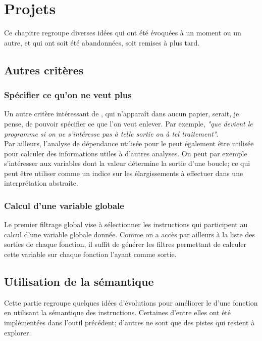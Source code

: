 \chapter{Projets}\label{sec-projets}

Ce chapitre regroupe diverses idées qui ont été évoquées à un moment ou un
autre, et qui ont soit été abandonnées, soit remises à plus tard.

\section{Autres critères}

\subsection{Spécifier ce qu'on ne veut plus}

Un autre critère intéressant de \slicing, qui n'apparaît dans aucun papier,
serait, je pense, de pouvoir spécifier ce que l'on veut enlever.
Par exemple, {\it "que devient le programme si on ne s'intéresse pas
à telle sortie ou à tel traitement"}.\\

Par ailleurs, l'analyse de dépendance utilisée pour le \slicing
peut également être utilisée pour calculer des informations utiles à d'autres
analyses. On peut par exemple s'intéresser aux variables dont la valeur
détermine la sortie d'une boucle; ce qui peut être utiliser comme un indice
sur les élargissements à effectuer dans une interprétation abstraite.

\subsection{Calcul d'une variable globale}

Le premier filtrage global vise à sélectionner les instructions qui
participent au calcul d'une variable globale donnée.
Comme on a accès par ailleurs à la liste des sorties de chaque fonction,
il suffit de générer les filtres permettant de calculer
cette variable sur chaque fonction l'ayant comme sortie.

\section{Utilisation de la sémantique}

Cette partie regroupe quelques idées d'évolutions pour améliorer le \slicing
d'une fonction en utilisant la sémantique des instructions.
Certaines d'entre elles ont été implémentées dans l'outil précédent;
d'autres ne sont que des pistes qui restent à explorer.


